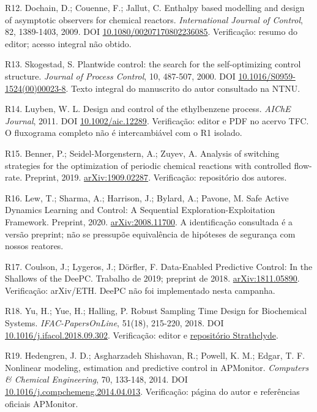 \documentclass[
  11pt,
  letterpaper,
]{article}
\begin{document}
R12. Dochain, D.; Couenne, F.; Jallut, C. Enthalpy based modelling and
design of asymptotic observers for chemical reactors.
\emph{International Journal of Control}, 82, 1389-1403, 2009. DOI
\href{https://doi.org/10.1080/00207170802236085}{10.1080/00207170802236085}.
Verificação: resumo do editor; acesso integral não obtido.

R13. Skogestad, S. Plantwide control: the search for the self-optimizing
control structure. \emph{Journal of Process Control}, 10, 487-507, 2000.
DOI
\href{https://doi.org/10.1016/S0959-1524(00)00023-8}{10.1016/S0959-1524(00)00023-8}.
Texto integral do manuscrito do autor consultado na NTNU.

R14. Luyben, W. L. Design and control of the ethylbenzene process.
\emph{AIChE Journal}, 2011. DOI
\href{https://doi.org/10.1002/aic.12289}{10.1002/aic.12289}.
Verificação: editor e PDF no acervo TFC. O fluxograma completo não é
intercambiável com o R1 isolado.

R15. Benner, P.; Seidel-Morgenstern, A.; Zuyev, A. Analysis of switching
strategies for the optimization of periodic chemical reactions with
controlled flow-rate. Preprint, 2019.
\href{https://arxiv.org/abs/1909.02287}{arXiv:1909.02287}. Verificação:
repositório dos autores.

R16. Lew, T.; Sharma, A.; Harrison, J.; Bylard, A.; Pavone, M. Safe
Active Dynamics Learning and Control: A Sequential
Exploration-Exploitation Framework. Preprint, 2020.
\href{https://arxiv.org/abs/2008.11700}{arXiv:2008.11700}. A
identificação consultada é a versão preprint; não se pressupõe
equivalência de hipóteses de segurança com nossos reatores.

R17. Coulson, J.; Lygeros, J.; Dörfler, F. Data-Enabled Predictive
Control: In the Shallows of the DeePC. Trabalho de 2019; preprint de
2018. \href{https://arxiv.org/abs/1811.05890}{arXiv:1811.05890}.
Verificação: arXiv/ETH. DeePC não foi implementado nesta campanha.

R18. Yu, H.; Yue, H.; Halling, P. Robust Sampling Time Design for
Biochemical Systems. \emph{IFAC-PapersOnLine}, 51(18), 215-220, 2018.
DOI
\href{https://doi.org/10.1016/j.ifacol.2018.09.302}{10.1016/j.ifacol.2018.09.302}.
Verificação: editor e
\href{https://strathprints.strath.ac.uk/63696/}{repositório
Strathclyde}.

R19. Hedengren, J. D.; Asgharzadeh Shishavan, R.; Powell, K. M.; Edgar,
T. F. Nonlinear modeling, estimation and predictive control in
APMonitor. \emph{Computers \& Chemical Engineering}, 70, 133-148, 2014.
DOI
\href{https://doi.org/10.1016/j.compchemeng.2014.04.013}{10.1016/j.compchemeng.2014.04.013}.
Verificação: página do autor e referências oficiais APMonitor.
\end{document}
